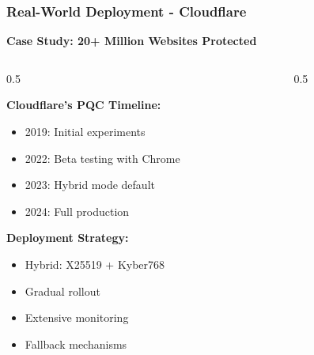 \documentclass[aspectratio=169,10pt]{beamer}
\newcommand{\slideheader}[1]{\frametitle{#1}}
\theoremstyle{plain}
\begin{document}
\begin{frame}
  \slideheader{Real-World Deployment - Cloudflare}
  
  \begin{center}
    \textbf{\large Case Study: 20+ Million Websites Protected}
  \end{center}
  
  \vspace{0.5cm}
  
  \begin{columns}[T]
    \begin{column}{0.5\textwidth}

    \textbf{Cloudflare's PQC Timeline:}
    \begin{itemize}
      \item 2019: Initial experiments
      \item 2022: Beta testing with Chrome
      \item 2023: Hybrid mode default
      \item 2024: Full production
    \end{itemize}
    
    \vspace{0.3cm}
    
    \textbf{Deployment Strategy:}
    \begin{itemize}
      \item Hybrid: X25519 + Kyber768
      \item Gradual rollout
      \item Extensive monitoring
      \item Fallback mechanisms
    \end{itemize}
  
    \end{column}
    \begin{column}{0.5\textwidth}

\end{column}
\end{columns}
\end{frame}
\end{document}
